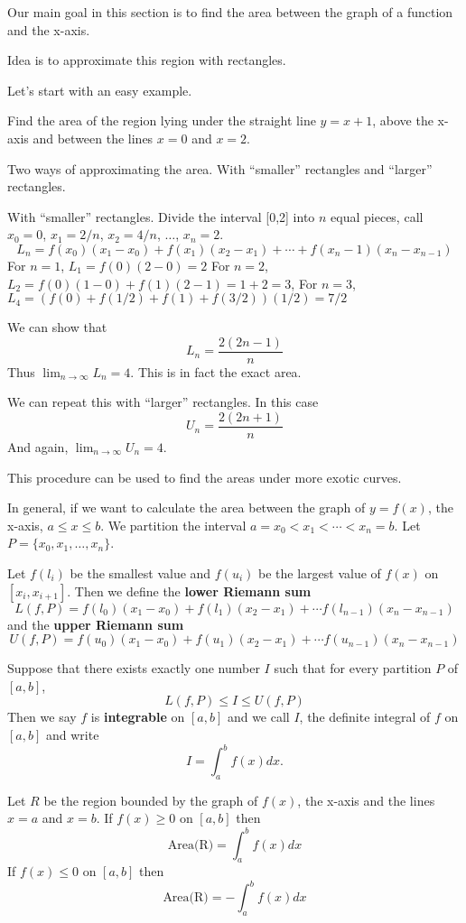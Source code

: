 \documentclass[../main.tex]{subfiles}
\begin{document}
Our main goal in this section is to find the area between the graph of a function and the x-axis.

Idea is to approximate this region with rectangles.

Let's start with an easy example.
\begin{example}
  Find the area of the region lying under the straight line $y=x+1$, above the x-axis and between the lines $x=0$ and $x=2$.
\end{example}

\begin{solution}
  Two ways of approximating the area. With ``smaller'' rectangles and ``larger'' rectangles.

  With ``smaller'' rectangles. Divide the interval [0,2] into $n$ equal pieces, call $x_0=0$, $x_1=2/n$, $x_2=4/n$, $\dots$, $x_n=2$.
  \[
    L_n = f(x_0) (x_1 - x_0) + f(x_1) (x_2-x_1) + \cdots + f(x_n-1) (x_n-x_{n-1})
  \]
  For $n=1$, $L_1 = f(0) (2-0) = 2$
  For $n=2$, $L_2 = f(0) (1-0) +f(1) (2-1) = 1 + 2 = 3$,
  For $n=3$, $L_4 = (f(0) + f(1/2) + f(1) + f(3/2)) (1/2) = 7/2$

  We can show that
  \[
    L_n = \frac{2(2n-1)}{n}
  \]
  Thus $\lim_{n \to \infty} L_n = 4$. This is in fact the exact area.

  We can repeat this with ``larger'' rectangles. In this case
  \[
    U_n = \frac{2(2n+1)}{n}
  \]
  And again, $\lim_{n \to \infty} U_n = 4$.
\end{solution}

This procedure can be used to find the areas under more exotic curves.

In general, if we want to calculate the area between the graph of $y=f(x)$, the x-axis, $a \le x \le b$. We partition the interval $a=x_0 < x_1 < \cdots < x_n = b$. Let $P=\{x_0, x_1, \dots, x_n\}$.

\begin{definition}
  Let $f(l_i)$ be the smallest value and $f(u_i)$ be the largest value of $f(x)$ on $[x_i, x_{i+1}]$. Then we define the \textbf{lower Riemann sum}
  \[
    L(f, P) = f(l_0) (x_1-x_0) + f(l_1) (x_2-x_1) + \cdots f(l_{n-1}) (x_n - x_{n-1})
  \]
  and the \textbf{upper Riemann sum}
  \[
    U(f, P) = f(u_0) (x_1-x_0) + f(u_1) (x_2-x_1) + \cdots f(u_{n-1}) (x_n - x_{n-1})
  \]

  Suppose that there exists exactly one number $I$ such that for every partition $P$ of $[a, b]$,
  \[
    L(f, P) \le I \le U(f, P)
  \]
  Then we say $f$ is \textbf{integrable} on $[a, b]$ and we call $I$, the definite integral of $f$ on $[a,b]$ and write
  \[
    I = \int_a^b f(x) dx.
  \]
\end{definition}
Let $R$ be the region bounded by the graph of $f(x)$, the x-axis and the lines $x=a$ and $x=b$. If $f(x) \ge 0$ on $[a, b]$ then
\[
  \text{Area(R)} = \int_a^b f(x) dx
\]
If $f(x) \le 0$ on $[a, b]$ then
\[
  \text{Area(R)} = -\int_a^b f(x) dx
\]
\end{document}
